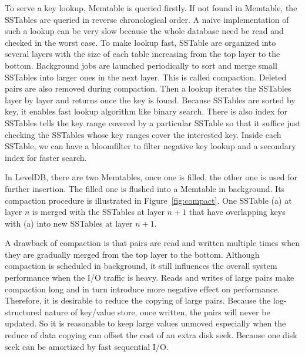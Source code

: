 To serve a key lookup, Memtable is queried firstly. If not found in
Memtable, the SSTables are queried in reverse chronological order. A
naive implementation of such a lookup can be very slow because the
whole database need be read and checked in the worst case. To make
lookup fast, SSTable are organized into several layers with the size
of each table increasing from the top layer to the bottom. Background
jobs are launched periodically to sort and merge small SSTables into
larger ones in the next layer. This is called compaction. Deleted
pairs are also removed during compaction. Then a lookup iterates the
SSTables layer by layer and returns once the key is found.  Because
SSTables are sorted by key, it enables fast lookup algorithm like
binary search. There is also index for SSTables tells the key range
covered by a particular SSTable so that it suffice just checking the
SSTables whose key ranges cover the interested key. Inside each
SSTable, we can have a bloomfilter to filter negative key lookup and a
secondary index for faster search.

In LevelDB, there are two Memtables, once one is filled, the other one
is used for further insertion. The filled one is flushed into a
Memtable in background. Its compaction procedure is illustrated in
Figure~\ref{fig:compact}. One SSTable (a) at layer $n$ is merged with
the SSTables at layer $n+1$ that have overlapping keys with (a) into
new SSTables at layer $n+1$.

A drawback of compaction is that pairs are read and written multiple
times when they are gradually merged from the top layer to the bottom.
Although compaction is scheduled in background, it still influences
the overall system performance when the I/O traffic is heavy. Reads
and writes of large pairs make compaction long and in turn introduce
more negative effect on performance. Therefore, it is desirable to
reduce the copying of large pairs. Because the log-structured nature
of key/value store, once written, the pairs will never be updated. So
it is reasonable to keep large values unmoved especially when the
reduce of data copying can offset the cost of an extra disk seek.
Because one disk seek can be amortized by fast sequential I/O.

